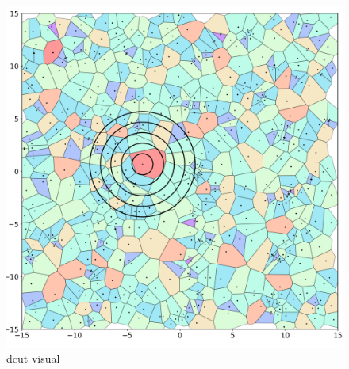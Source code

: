 \begin{figure}
  \center
  \includegraphics[width=\linewidth, height=\textheight,keepaspectratio]{figures/crystalline_voronoi_d_cut_circles.png} 
  \caption{dcut visual}
  \label{fig:dcut}
\end{figure}


